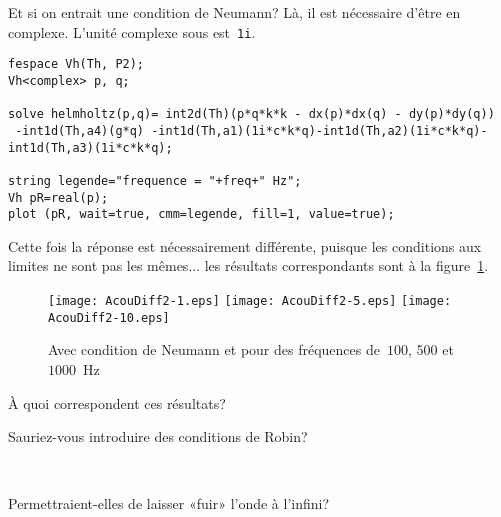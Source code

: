 \medskip
Et si on entrait une condition de Neumann? Là, il est nécessaire d'être en complexe. L'unité complexe sous \freefem est~\lstinline!1i!.
\begin{lstlisting}[firstnumber=14]
fespace Vh(Th, P2);
Vh<complex> p, q;

solve helmholtz(p,q)= int2d(Th)(p*q*k*k - dx(p)*dx(q) - dy(p)*dy(q))
 -int1d(Th,a4)(g*q) -int1d(Th,a1)(1i*c*k*q)-int1d(Th,a2)(1i*c*k*q)-int1d(Th,a3)(1i*c*k*q);

string legende="frequence = "+freq+" Hz";
Vh pR=real(p);
plot (pR, wait=true, cmm=legende, fill=1, value=true);
\end{lstlisting}
Cette fois la réponse est nécessairement différente, puisque les conditions aux limites ne sont pas les mêmes... les résultats correspondants sont à la figure~\ref{Fig-AcouDiff2}.
\begin{figure}[h!]
\centering
   \texttt{[image: AcouDiff2-1.eps]}\hfill
   \texttt{[image: AcouDiff2-5.eps]}\hfill
   \texttt{[image: AcouDiff2-10.eps]}
\caption{Avec condition de Neumann et pour des fréquences de~$100$, $500$ et $1000$~Hz}\label{Fig-AcouDiff2}
\end{figure}

\medskip
À quoi correspondent ces résultats?
\begin{flushright}
\end{flushright}

Sauriez-vous introduire des conditions de Robin?
\begin{flushright}
\\
\end{flushright}

Permettraient-elles de laisser «fuir» l'onde à l'infini?
\begin{flushright}
\\
\end{flushright}

